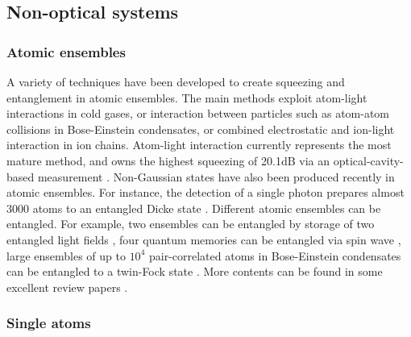 \documentclass[aps, rmp, twocolumn, amsmath, amssymb, nofootinbib, superscriptaddress, longbibliography, floatfix, table-of-contents, eqsecnum]{revtex4-1}
\begin{document}
%
%

\subsection{Non-optical systems} 

%
%

\subsubsection{Atomic ensembles} 

A variety of techniques have been developed to create squeezing and entanglement in atomic ensembles. The main methods exploit atom-light interactions in cold gases, or interaction between particles such as atom-atom collisions in Bose-Einstein condensates, or combined electrostatic and ion-light interaction in ion chains. Atom-light interaction currently represents the most mature method, and owns the highest squeezing of 20.1dB via an optical-cavity-based measurement \cite{hosten2016measurement}. Non-Gaussian states have also been produced recently in atomic ensembles. For instance, the detection of a single photon prepares almost 3000 atoms to an entangled Dicke state \cite{mcconnell2015entanglement}. Different atomic ensembles can be entangled. For example, two ensembles can be entangled by storage of two entangled light fields \cite{lukin2000entanglement}, four quantum memories can be entangled via spin wave \cite{choi2010entanglement}, large ensembles of up to $10^4$ pair-correlated atoms in Bose-Einstein condensates can be entangled to a twin-Fock state \cite{lucke2011twin}. More contents can be found in some excellent review papers \cite{kimble2008quantum, hammerer2010quantum, sangouard2011quantum, pezze2016non}.

%
%

\subsubsection{Single atoms} 
\end{document}

